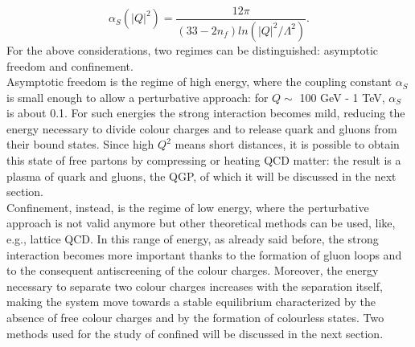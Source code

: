 %
\begin{equation}
 \alpha_{S}(|Q|^{2})= \frac{12\pi}{(33-2n_{f})ln(|Q|^{2} / \Lambda^{2})}.
 \label{eq:aqcd2}
\end{equation}
%
For the above considerations, two regimes can be distinguished: asymptotic freedom and confinement.\\
Asymptotic freedom is the regime of high energy, where the coupling constant $\alpha_{S}$ is small enough to allow a perturbative approach: for $Q \sim$ 100 GeV - 1 TeV, $\alpha_{S}$ is about 0.1. For such energies the strong interaction becomes mild, reducing the energy necessary to divide colour charges and to release quark and gluons from their bound states. Since high $Q^{2}$ means short distances, it is possible to obtain this state of free partons by compressing or heating QCD matter: the result is a plasma of quark and gluons, the QGP, of which it will be discussed in the next section.\\
Confinement, instead, is the regime of low energy, where the perturbative approach is not valid anymore but other theoretical methods can be used, like, e.g., lattice QCD. In this range of energy, as already said before, the strong interaction becomes more important thanks to the formation of gluon loops and to the consequent antiscreening of the colour charges. Moreover, the energy necessary to separate two colour charges increases with the separation itself, making the system move towards a stable equilibrium characterized by the absence of free colour charges and by the formation of colourless states. Two methods used for the study of confined will be discussed in the next section.

\clearpage

